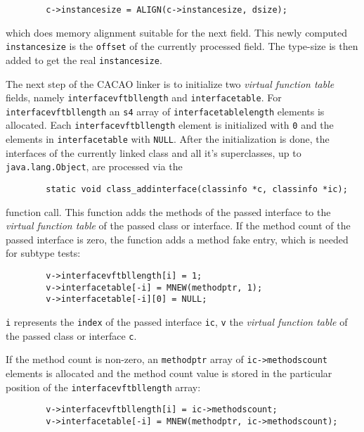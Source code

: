 \begin{verbatim}
        c->instancesize = ALIGN(c->instancesize, dsize);
\end{verbatim}

which does memory alignment suitable for the next field. This newly
computed \texttt{instancesize} is the \texttt{offset} of the currently
processed field. The type-size is then added to get the real
\texttt{instancesize}.

The next step of the CACAO linker is to initialize two \textit{virtual
function table} fields, namely \texttt{interfacevftbllength} and
\texttt{interfacetable}. For \texttt{interfacevftbllength} an
\texttt{s4} array of \texttt{interfacetablelength} elements is
allocated. Each \texttt{interfacevftbllength} element is initialized
with \texttt{0} and the elements in \texttt{interfacetable} with
\texttt{NULL}. After the initialization is done, the interfaces of the
currently linked class and all it's superclasses, up to
\texttt{java.lang.Object}, are processed via the

\begin{verbatim}
        static void class_addinterface(classinfo *c, classinfo *ic);
\end{verbatim}

function call. This function adds the methods of the passed interface
to the \textit{virtual function table} of the passed class or
interface. If the method count of the passed interface is zero, the
function adds a method fake entry, which is needed for subtype
tests:

\begin{verbatim}
        v->interfacevftbllength[i] = 1;
        v->interfacetable[-i] = MNEW(methodptr, 1);
        v->interfacetable[-i][0] = NULL;
\end{verbatim}

\texttt{i} represents the \texttt{index} of the passed interface
\texttt{ic}, \texttt{v} the \textit{virtual function table} of the
passed class or interface \texttt{c}.

If the method count is non-zero, an \texttt{methodptr} array of
\texttt{ic->methodscount} elements is allocated and the method count
value is stored in the particular position of the
\texttt{interfacevftbllength} array:

\begin{verbatim}
        v->interfacevftbllength[i] = ic->methodscount;
        v->interfacetable[-i] = MNEW(methodptr, ic->methodscount);
\end{verbatim}

